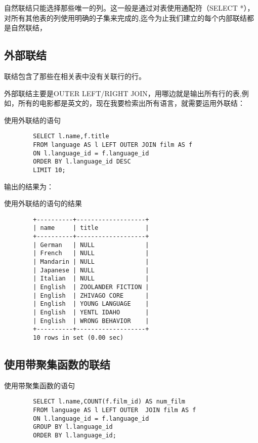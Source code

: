 \documentclass[UTF8]{article}
\begin{document}
自然联结只能选择那些唯一的列。这一般是通过对表使用通配符（SELECT *），对所有其他表的列使用明确的子集来完成的,迄今为止我们建立的每个内部联结都是自然联结，

\subsection{外部联结}

\begin{redbox}[frametitle={Defination 16.3.1 外部联结}]
        联结包含了那些在相关表中没有关联行的行。
\end{redbox}

外部联结主要是OUTER LEFT/RIGHT JOIN，用哪边就是输出所有行的表,例如，所有的电影都是英文的，现在我要检索出所有语言，就需要运用外联结：

\begin{listing}[H]
        \caption{使用外联结的语句}
	\label{code:useouterjoinclause}
\begin{verbatim}
        SELECT l.name,f.title 
        FROM language AS l LEFT OUTER JOIN film AS f 
        ON l.language_id = f.language_id 
        ORDER BY l.language_id DESC 
        LIMIT 10;
\end{verbatim}
\end{listing}

输出的结果为：

\begin{listing}[H]
	\caption{使用外联结的语句的结果}
	\label{code:useouterjoinclauseresult}
\begin{verbatim}
        +----------+-------------------+
        | name     | title             |
        +----------+-------------------+
        | German   | NULL              |
        | French   | NULL              |
        | Mandarin | NULL              |
        | Japanese | NULL              |
        | Italian  | NULL              |
        | English  | ZOOLANDER FICTION |
        | English  | ZHIVAGO CORE      |
        | English  | YOUNG LANGUAGE    |
        | English  | YENTL IDAHO       |
        | English  | WRONG BEHAVIOR    |
        +----------+-------------------+
        10 rows in set (0.00 sec)
\end{verbatim}
\end{listing}

\subsection{使用带聚集函数的联结}

\begin{listing}[H]
        \caption{使用带聚集函数的语句}
	\label{code:useaggregatefunctionclause}
\begin{verbatim}
        SELECT l.name,COUNT(f.film_id) AS num_film 
        FROM language AS l LEFT OUTER  JOIN film AS f 
        ON l.language_id = f.language_id 
        GROUP BY l.language_id 
        ORDER BY l.language_id;
\end{verbatim}
\end{listing}
\end{document}
